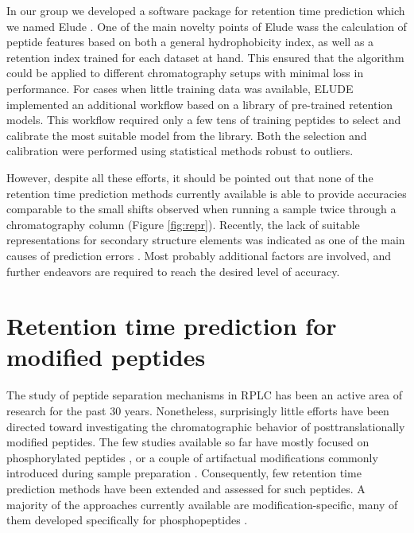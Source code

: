 \documentclass[a4paper]{article}
\begin{document}
\vspace{0.15cm}

In our group we developed a software package for retention time prediction which we named {\sc
Elude} \cite{elude1, elude2}. One of the main novelty
points of {\sc Elude} wass the calculation of peptide features based on
both a general hydrophobicity index, as well as a retention index
trained for each dataset at hand. This ensured that the algorithm
could be applied to different chromatography setups with minimal loss
in performance. For cases when little training data was available,
{\sc ELUDE} implemented an additional workflow based on a library of
pre-trained retention models. This workflow required only a few tens
of training peptides to select and calibrate the most suitable model
from the library. Both the selection and calibration were performed
using statistical methods robust to outliers.

\vspace{0.15cm}

However, despite all these efforts, it should be pointed out that none
of the retention time prediction methods currently available is able
to provide accuracies comparable to the small shifts observed when
running a sample twice through a chromatography column
(Figure \ref{fig:repr}). Recently, the lack of suitable
representations for secondary structure elements was indicated as one
of the main causes of prediction errors \cite{Reimer2012}.  Most
probably additional factors are involved, and further endeavors are
required to reach the desired level of accuracy.

\section{\label{sec:rtpredm}Retention time prediction for modified peptides}

The study of peptide separation mechanisms in RPLC has been an active
area of research for the past 30 years. Nonetheless, surprisingly
little efforts have been directed toward investigating the
chromatographic behavior of posttranslationally modified peptides. The
few studies available so far have mostly focused on phosphorylated
peptides \cite{Kim2007}, or a couple of artifactual modifications
commonly introduced during sample
preparation \cite{Reimer2011}. Consequently, few retention time
prediction methods have been extended and assessed for such
peptides. A majority of the approaches currently available are
modification-specific, many of them developed specifically for
phosphopeptides \cite{Kawakami2005, perlova2010}.
\end{document}
